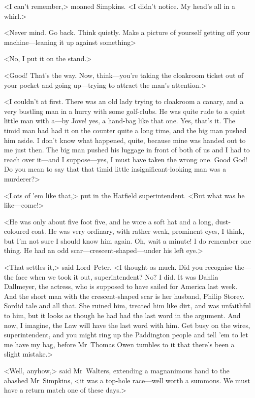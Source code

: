 <I can't remember,> moaned Simpkins. <I didn't notice. My head's all in a whirl.>

<Never mind. Go back. Think quietly. Make a picture of yourself getting off your machine—leaning it up against something\longdash>

<No, I put it on the stand.>

<Good! That's the way. Now, think—you're taking the cloakroom ticket out of your pocket and going up—trying to attract the man's attention.>

<I couldn't at first. There was an old lady trying to cloakroom a canary, and a very bustling man in a hurry with some golf-clubs. He was quite rude to a quiet little man with a—by Jove! yes, a hand-bag like that one. Yes, that's it. The timid man had had it on the counter quite a long time, and the big man pushed him aside. I don't know what happened, quite, because mine was handed out to me just then. The big man pushed his luggage in front of both of us and I had to reach over it—and I suppose—yes, I must have taken the wrong one. Good God! Do you mean to say that that timid little insignificant-looking man was a murderer?>

<Lots of 'em like that,> put in the Hatfield superintendent. <But what was he like—come!>

<He was only about five foot five, and he wore a soft hat and a long, dust-coloured coat. He was very ordinary, with rather weak, prominent eyes, I think, but I'm not sure I should know him again. Oh, wait a minute! I do remember one thing. He had an odd scar—crescent-shaped—under his left eye.>

<That settles it,> said Lord~Peter. <I thought as much. Did you recognise the—the face when we took it out, superintendent? No? I did. It was Dahlia Dallmeyer, the actress, who is supposed to have sailed for America last week. And the short man with the crescent-shaped scar is her husband, Philip Storey. Sordid tale and all that. She ruined him, treated him like dirt, and was unfaithful to him, but it looks as though he had had the last word in the argument. And now, I imagine, the Law will have the last word with him. Get busy on the wires, superintendent, and you might ring up the Paddington people and tell 'em to let me have my bag, before Mr~Thomas Owen tumbles to it that there's been a slight mistake.>

<Well, anyhow,> said Mr~Walters, extending a magnanimous hand to the abashed Mr~Simpkins, <it was a top-hole race—well worth a summons. We must have a return match one of these days.>


